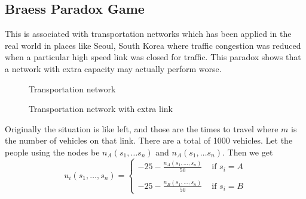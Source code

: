 \documentclass{article}
\theoremstyle{definition}
\begin{document}
\subsection{Braess Paradox Game}
This is associated with transportation networks which has been applied in the real world in places like Seoul, South Korea where traffic congestion was reduced when a particular high speed link was closed for traffic. This paradox shows that a network with extra capacity may actually perform worse.
\begin{figure}[H]
\centering
\begin{minipage}[b]{0.4\textwidth}
\caption{Transportation network}
\end{minipage}
\begin{minipage}[b]{0.4\textwidth}
\caption{Transportation network with extra link}
\end{minipage}
\end{figure}
Originally the situation is like left, and those are the times to travel where $m$ is the number of vehicles on that link. There are a total of 1000 vehicles. Let the people using the nodes be $n_A(s_1,\dots s_n)$ and $n_A(s_1,\dots s_n)$. Then we get 
\[
 u_i(s_1,\dots,s_n) =
 \begin{cases} -25 - \frac{n_A(s_1,\dots,s_n)}{50} & \text{ if } s_i = A \\
 \\
  -25 - \frac{n_B(s_1,\dots,s_n)}{50} & \text{ if } s_i = B
 \end{cases}
 \]
\end{document}
